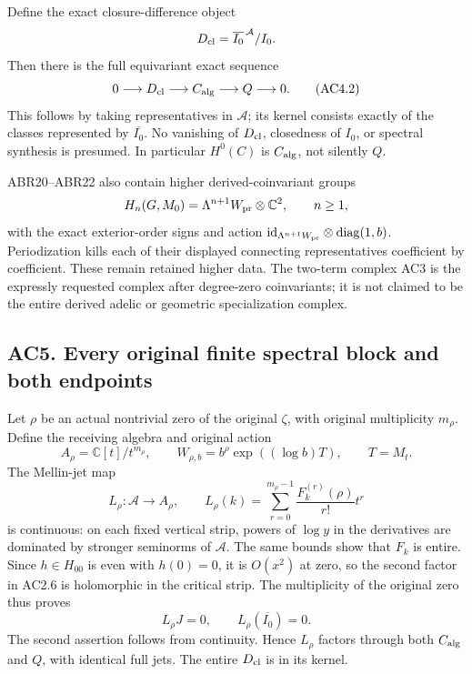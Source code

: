 Define the exact closure-difference object \[
 D_{\rm cl}=\overline{I_0}^{\,\mathcal A}/I_0.
\] Then there is the full equivariant exact sequence \[
 0\longrightarrow D_{\rm cl}\longrightarrow C_{\rm alg}
 \longrightarrow Q\longrightarrow0.
\tag{AC4.2}
\] This follows by taking representatives in \(\mathcal A\); its kernel
consists exactly of the classes represented by \(\overline{I_0}\). No
vanishing of \(D_{\rm cl}\), closedness of \(I_0\), or spectral
synthesis is presumed. In particular \(H^0(C)\) is \(C_{\rm alg}\), not
silently \(Q\).

ABR20--ABR22 also contain higher derived-coinvariant groups \[
 H_n(G,M_0)=\Lambda^{n+1}W_{\rm pr}\otimes\mathbb C^2,\qquad n\geq1,
\] with the exact exterior-order signs and action
\(\mathrm{id}_{\Lambda^{n+1}W_{\rm pr}}\otimes\operatorname{diag}(1,b)\).
Periodization kills each of their displayed connecting representatives
coefficient by coefficient. These remain retained higher data. The
two-term complex AC3 is the expressly requested complex after
degree-zero coinvariants; it is not claimed to be the entire derived
adelic or geometric specialization complex.

\subsection{AC5. Every original finite spectral block and both
endpoints}\label{ac5.-every-original-finite-spectral-block-and-both-endpoints}

Let \(\rho\) be an actual nontrivial zero of the original \(\zeta\),
with original multiplicity \(m_\rho\). Define the receiving algebra and
original action \[
 A_\rho=\mathbb C[t]/t^{m_\rho},\qquad
 W_{\rho,b}=b^\rho\exp((\log b)T),\qquad T=M_t.
\tag{AC5.1}
\] The Mellin-jet map \[
 L_\rho:\mathcal A\longrightarrow A_\rho,\qquad
 L_\rho(k)=\sum_{r=0}^{m_\rho-1}\frac{F_k^{(r)}(\rho)}{r!}t^r
\tag{AC5.2}
\] is continuous: on each fixed vertical strip, powers of \(\log y\) in
the derivatives are dominated by stronger seminorms of \(\mathcal A\).
The same bounds show that \(F_k\) is entire. Since \(h\in H_{00}\) is
even with \(h(0)=0\), it is \(O(x^2)\) at zero, so the second factor in
AC2.6 is holomorphic in the critical strip. The multiplicity of the
original zero thus proves \[
 L_\rho J=0,\qquad L_\rho(\overline{I_0})=0.
\tag{AC5.3}
\] The second assertion follows from continuity. Hence \(L_\rho\)
factors through both \(C_{\rm alg}\) and \(Q\), with identical full
jets. The entire \(D_{\rm cl}\) is in its kernel.

